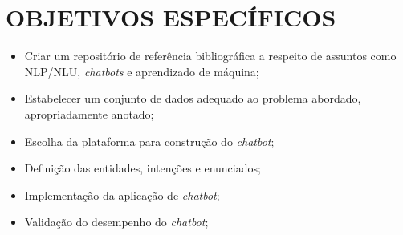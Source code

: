 \section{OBJETIVOS ESPECÍFICOS}
\label{sec:objetivos_especificos}

\begin{itemize}
    \item Criar um repositório de referência bibliográfica a respeito de assuntos como NLP/NLU, \textit{chatbots} e aprendizado de máquina;
    \item Estabelecer um conjunto de dados adequado ao problema abordado, apropriadamente anotado;
    \item Escolha da plataforma para construção do \textit{chatbot};
    \item Definição das entidades, intenções e enunciados;
    \item Implementação da aplicação de \textit{chatbot};
    \item Validação do desempenho do \textit{chatbot};
\end{itemize}
